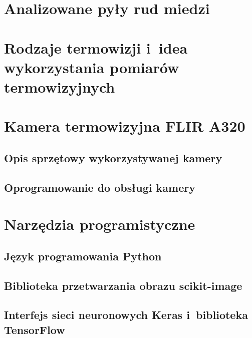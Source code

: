\section{Analizowane pyły rud miedzi}

\section{Rodzaje termowizji i~idea wykorzystania pomiarów termowizyjnych}

\section{Kamera termowizyjna FLIR A320}

\subsection{Opis sprzętowy wykorzystywanej kamery}

\subsection{Oprogramowanie do obsługi kamery}

\section{Narzędzia programistyczne}

\subsection{Język programowania Python}

\subsection{Biblioteka przetwarzania obrazu scikit-image}

\subsection{Interfejs sieci neuronowych Keras i~biblioteka TensorFlow}
